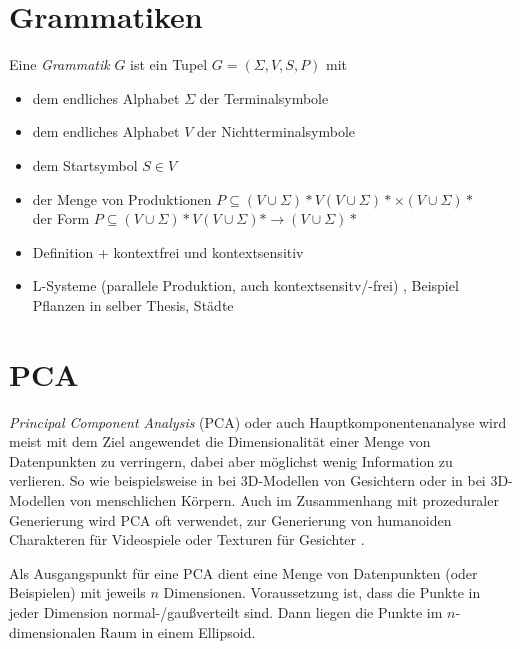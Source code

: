\section{Grammatiken}

Eine \emph{Grammatik} $G$ \cite[S.\ 3]{tgiScript} ist ein Tupel $G = (\Sigma, V, S, P)$ mit 
\begin{itemize}
 \item dem endliches Alphabet $\Sigma$ der Terminalsymbole
 \item dem endliches Alphabet $V$ der Nichtterminalsymbole
 \item dem Startsymbol $S \in V$
 \item der Menge von Produktionen $P \subseteq (V \cup \Sigma)* V (V \cup \Sigma)* \times (V \cup \Sigma)*$\\ der Form $P \subseteq (V \cup \Sigma)* V (V \cup \Sigma)* \rightarrow (V \cup \Sigma)*$
\end{itemize}


\begin{itemize}
 \item Definition + kontextfrei und kontextsensitiv
 \item L-Systeme (parallele Produktion, auch kontextsensitv/-frei) \cite{Paramteric_L-Systems}, Beispiel Pflanzen in selber Thesis, Städte \cite{cityGeneration}
\end{itemize}



\section{PCA} %
\label{PCA}

 
 \emph{Principal Component Analysis} (PCA) oder auch Hauptkomponentenanalyse \cite{PCA} wird meist mit dem Ziel angewendet die Dimensionalität einer Menge von Datenpunkten zu verringern, dabei aber möglichst wenig Information zu verlieren.
 So wie beispielsweise in \cite{PCA_faces} bei 3D-Modellen von Gesichtern oder in \cite{PCA_bodies} bei 3D-Modellen von menschlichen Körpern. Auch im Zusammenhang mit prozeduraler Generierung wird PCA oft verwendet, \zb zur Generierung von humanoiden Charakteren für Videospiele \cite{ProceduralCharacterGeneration} oder Texturen für Gesichter \cite{GeneratingFacialTextures}.
 
 Als Ausgangspunkt für eine PCA dient eine Menge von Datenpunkten (oder Beispielen) mit jeweils $n$ Dimensionen. Voraussetzung ist, dass die Punkte in jeder Dimension normal-/gaußverteilt sind. Dann liegen die Punkte im $n$-dimensionalen Raum in einem Ellipsoid.
 
